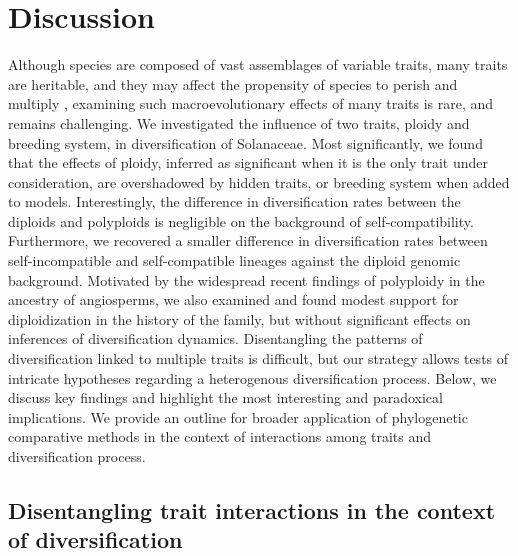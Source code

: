 \section{Discussion}

%
Although species are composed of vast assemblages of variable traits, many traits are heritable, and they may affect the propensity of species to perish and multiply \citep{lewontin_1970}, examining such macroevolutionary effects of many traits is rare, and remains challenging.
We investigated the influence of two traits, ploidy and breeding system, in diversification of Solanaceae.
Most significantly, we found that the effects of ploidy, inferred as significant when it is the only trait under consideration, are overshadowed by hidden traits, or breeding system when added to models.  
Interestingly, the difference in diversification rates between the diploids and polyploids is negligible on the background of self-compatibility.
Furthermore, we recovered a smaller difference in diversification rates between self-incompatible and self-compatible lineages against the diploid genomic background. %
Motivated by the widespread recent findings of polyploidy in the ancestry of angiosperms, we also examined and found modest support for diploidization in the history of the family, but without significant effects on inferences of diversification dynamics. %
Disentangling the patterns of diversification linked to multiple traits is difficult, but our strategy allows tests of intricate hypotheses regarding a heterogenous diversification process.
Below, we discuss key findings and highlight the most interesting and paradoxical implications.
We provide an outline for broader application of phylogenetic comparative methods in the context of interactions among traits and diversification process.

\subsection*{Disentangling trait interactions in the context of diversification} %

